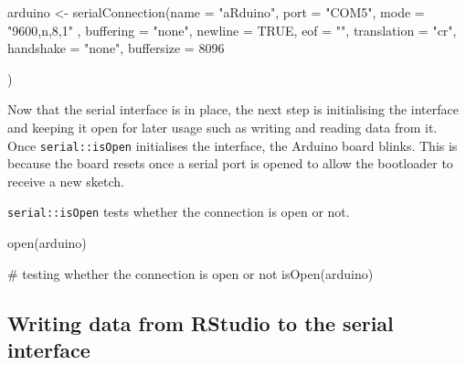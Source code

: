 \documentclass[
  letterpaper,
  DIV=11,
  numbers=noendperiod]{scrreprt}
\newenvironment{Shaded}{\begin{snugshade}}{\end{snugshade}}
\newcommand{\AttributeTok}[1]{\textcolor[rgb]{0.40,0.45,0.13}{#1}}
\newcommand{\CommentTok}[1]{\textcolor[rgb]{0.37,0.37,0.37}{#1}}
\newcommand{\ConstantTok}[1]{\textcolor[rgb]{0.56,0.35,0.01}{#1}}
\newcommand{\DecValTok}[1]{\textcolor[rgb]{0.68,0.00,0.00}{#1}}
\newcommand{\FunctionTok}[1]{\textcolor[rgb]{0.28,0.35,0.67}{#1}}
\newcommand{\NormalTok}[1]{\textcolor[rgb]{0.00,0.23,0.31}{#1}}
\newcommand{\OtherTok}[1]{\textcolor[rgb]{0.00,0.23,0.31}{#1}}
\newcommand{\StringTok}[1]{\textcolor[rgb]{0.13,0.47,0.30}{#1}}
\begin{document}
\begin{Shaded}
\begin{Highlighting}[]
\NormalTok{arduino }\OtherTok{\textless{}{-}}  \FunctionTok{serialConnection}\NormalTok{(}\AttributeTok{name =} \StringTok{"aRduino"}\NormalTok{,}
                           \AttributeTok{port =} \StringTok{"COM5"}\NormalTok{,}
                           \AttributeTok{mode =} \StringTok{"9600,n,8,1"}\NormalTok{ ,}
                           \AttributeTok{buffering =} \StringTok{"none"}\NormalTok{,}
                           \AttributeTok{newline =} \ConstantTok{TRUE}\NormalTok{,}
                           \AttributeTok{eof =} \StringTok{""}\NormalTok{,}
                           \AttributeTok{translation =} \StringTok{"cr"}\NormalTok{,}
                           \AttributeTok{handshake =} \StringTok{"none"}\NormalTok{,}
                           \AttributeTok{buffersize =} \DecValTok{8096}
                           
\NormalTok{                           )}
\end{Highlighting}
\end{Shaded}

Now that the serial interface is in place, the next step is initialising
the interface and keeping it open for later usage such as writing and
reading data from it. Once \texttt{serial::isOpen} initialises the
interface, the Arduino board blinks. This is because the board resets
once a serial port is opened to allow the bootloader to receive a new
sketch.

\texttt{serial::isOpen} tests whether the connection is open or not.

\begin{Shaded}
\begin{Highlighting}[]
\FunctionTok{open}\NormalTok{(arduino)}

\CommentTok{\# testing whether the connection is open or not}
\FunctionTok{isOpen}\NormalTok{(arduino)}
\end{Highlighting}
\end{Shaded}

\hypertarget{section}{%
\subsection{}\label{section}}

\hypertarget{writing-data-from-rstudio-to-the-serial-interface}{%
\subsection{\texorpdfstring{\textbf{Writing data from RStudio to the
serial
interface}}{Writing data from RStudio to the serial interface}}\label{writing-data-from-rstudio-to-the-serial-interface}}
\end{document}

